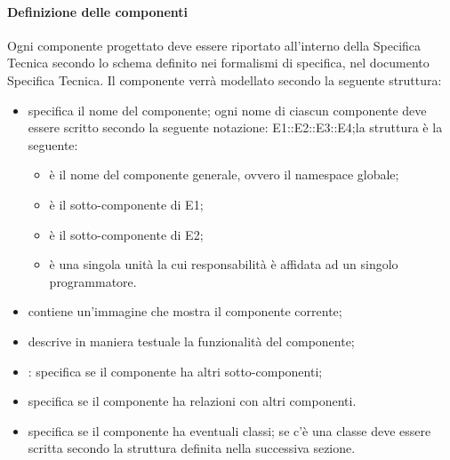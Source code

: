 \paragraph{Definizione delle componenti \\}
\label{}
Ogni componente progettato deve essere riportato all'interno della Specifica Tecnica secondo lo schema definito nei formalismi di specifica, nel documento Specifica Tecnica. Il componente verrà modellato secondo la seguente struttura:
\begin{itemize}
\item {}specifica il nome del componente; ogni nome di ciascun componente deve essere scritto secondo la seguente notazione: E1::E2::E3::E4;la struttura è la seguente: 
\begin{itemize}
\item {}è il nome del componente generale, ovvero il namespace globale;
\item {}è il sotto-componente di E1;
\item {}è il sotto-componente di E2;
\item {}è una singola unità la cui responsabilità è affidata ad un singolo programmatore.  
\end{itemize}
\item {}contiene un'immagine che mostra il componente corrente;
\item {}descrive in maniera testuale la funzionalità del componente;
\item {}: specifica se il componente ha altri sotto-componenti;
\item {} specifica se il componente ha relazioni con altri componenti.
\item {}specifica se il componente ha eventuali classi; se c'è una classe deve essere scritta secondo la struttura definita nella successiva sezione.
\end{itemize}

